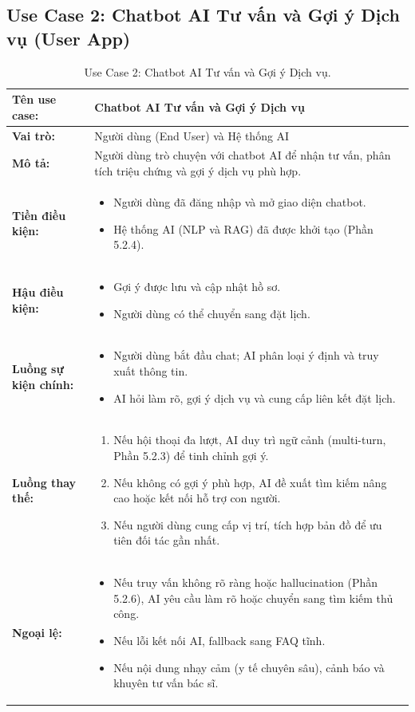 \subsection{Use Case 2: Chatbot AI Tư vấn và Gợi ý Dịch vụ (User App)}

\begin{table}[H]
\centering
\begin{tabular}{|p{3cm}|p{12cm}|}
\hline
\textbf{Tên use case:} & Chatbot AI Tư vấn và Gợi ý Dịch vụ \\
\hline
\textbf{Vai trò:} & Người dùng (End User) và Hệ thống AI \\
\hline
\textbf{Mô tả:} & Người dùng trò chuyện với chatbot AI để nhận tư vấn, phân tích triệu chứng và gợi ý dịch vụ phù hợp. \\
\hline
\textbf{Tiền điều kiện:} & 
\begin{itemize}
\item Người dùng đã đăng nhập và mở giao diện chatbot.
\item Hệ thống AI (NLP và RAG) đã được khởi tạo (Phần 5.2.4).
\end{itemize} \\
\hline
\textbf{Hậu điều kiện:} & 
\begin{itemize}
\item Gợi ý được lưu và cập nhật hồ sơ.
\item Người dùng có thể chuyển sang đặt lịch.
\end{itemize} \\
\hline
\textbf{Luồng sự kiện chính:} & 
\begin{itemize}
\item Người dùng bắt đầu chat; AI phân loại ý định và truy xuất thông tin.
\item AI hỏi làm rõ, gợi ý dịch vụ và cung cấp liên kết đặt lịch.
\end{itemize} \\
\hline
\textbf{Luồng thay thế:} & 
\begin{enumerate}
\item[a.] Nếu hội thoại đa lượt, AI duy trì ngữ cảnh (multi-turn, Phần 5.2.3) để tinh chỉnh gợi ý.
\item[b.] Nếu không có gợi ý phù hợp, AI đề xuất tìm kiếm nâng cao hoặc kết nối hỗ trợ con người.
\item[c.] Nếu người dùng cung cấp vị trí, tích hợp bản đồ để ưu tiên đối tác gần nhất.
\end{enumerate} \\
\hline
\textbf{Ngoại lệ:} & 
\begin{itemize}
\item Nếu truy vấn không rõ ràng hoặc hallucination (Phần 5.2.6), AI yêu cầu làm rõ hoặc chuyển sang tìm kiếm thủ công.
\item Nếu lỗi kết nối AI, fallback sang FAQ tĩnh.
\item Nếu nội dung nhạy cảm (y tế chuyên sâu), cảnh báo và khuyên tư vấn bác sĩ.
\end{itemize} \\
\hline
\end{tabular}
\caption{Use Case 2: Chatbot AI Tư vấn và Gợi ý Dịch vụ.}
\label{tab:uc2}
\end{table}

